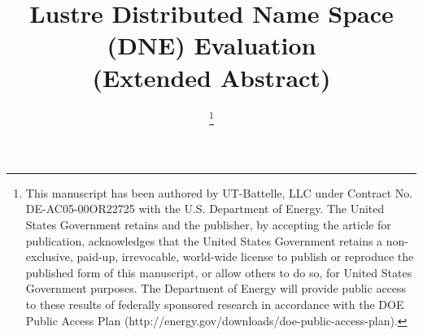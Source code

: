 \documentclass[conference,compsoc]{IEEEtran}
\begin{document}
%
\title{Lustre Distributed Name Space (DNE) Evaluation\\(Extended Abstract)}


\author{
\thanks{

This manuscript has been authored by UT-Battelle, LLC under Contract No.
DE-AC05-00OR22725 with the U.S. Department of Energy. The United States
Government retains and the publisher, by accepting the article for publication,
acknowledges that the United States Government retains a non-exclusive,
paid-up, irrevocable, world-wide license to publish or reproduce the published
form of this manuscript, or allow others to do so, for United States Government
purposes. The Department of Energy will provide public access to these results
of federally sponsored research in accordance with the DOE Public Access Plan
(http://energy.gov/downloads/doe-public-access-plan).

}
}


%
\end{document}

